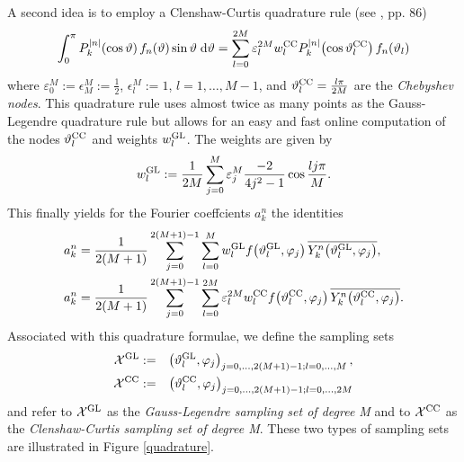 A second idea is to employ a Clenshaw-Curtis quadrature rule (see \cite{dara}, pp. 86)
$$
  \int_{0}^{\pi} P_{k}^{\left\vert n\right\vert}{\hspace{-0.4ex}}\left(\cos \vartheta\right) f_{n}{\hspace{-0.4ex}}\left(\vartheta\right) \sin \vartheta \; \text{\rm{d}} \vartheta = \sum_{l=0}^{2M} \varepsilon_{l}^{2M} w_{l}^{\mbox{\scriptsize\rm{CC}}} P_{k}^{\left\vert n\right\vert}{\hspace{-0.4ex}}\left(\cos \vartheta_{l}^{\mbox{\scriptsize\rm{CC}}}\right) f_{n}{\hspace{-0.4ex}}\left(\vartheta_{l}\right)
$$
where $\varepsilon_{0}^{M} := \epsilon_{M}^M := \frac{1}{2}$, $\epsilon_{l}^M := 1$, $l=1,\dots,M-1$, and $\vartheta_{l}^{\mbox{\scriptsize\rm{CC}}} = \frac{l\pi}{2M}$ are the \emph{Chebyshev nodes}.
This quadrature rule uses almost twice as many points as the Gauss-Legendre quadrature rule but allows for an easy and fast online computation of the nodes $\vartheta_{l}^{\mbox{\scriptsize\rm{CC}}}$
and weights $w_{l}^{\mbox{\scriptsize\rm{GL}}}$. The weights are given by
$$ w_{l}^{\mbox{\scriptsize\rm{GL}}} := \frac{1}{2M} \sum_{j=0}^{M} \varepsilon_{j}^{M} \frac{-2}{4j^2-1} \cos\frac{lj\pi}{M}.$$
This finally yields for the Fourier coeffcients $a_{k}^n$ the identities 
\begin{equation}
  \label{NFSFT:iDSFT}
  \begin{split}
    a_{k}^n & = \frac{1}{2(M+1)} \sum_{j=0}^{2(M+1)-1} \sum_{l=0}^{M} w_{l}^{\mbox{\scriptsize\rm{GL}}} f{\hspace{-0.4ex}}\left(\vartheta_{l}^{\mbox{\scriptsize\rm{GL}}},\varphi_{j}\right) \overline{Y_{k}^n{\hspace{-0.4ex}}\left(\vartheta_{l}^{\mbox{\scriptsize\rm{GL}}},\varphi_{j}\right)},\\
    a_{k}^n & = \frac{1}{2(M+1)} \sum_{j=0}^{2(M+1)-1} \sum_{l=0}^{2M} \varepsilon_{l}^{2M} w_{l}^{\mbox{\scriptsize\rm{CC}}} f{\hspace{-0.4ex}}\left(\vartheta_{l}^{\mbox{\scriptsize\rm{CC}}},\varphi_{j}\right) 
  \overline{Y_{k}^n{\hspace{-0.4ex}}\left(\vartheta_{l}^{\mbox{\scriptsize\rm{CC}}},\varphi_{j}\right)}.
  \end{split}
\end{equation}
Associated with this quadrature formulae, we define the sampling sets
\begin{eqnarray*}
  \mathcal{X}^{\mbox{\scriptsize\rm{GL}}} & := & \left(\vartheta_{l}^{\mbox{\scriptsize\rm{GL}}},\varphi_{j}\right)_{j=0,\dots,2(M+1)-1;l=0,\dots,M},\\
  \mathcal{X}^{\mbox{\scriptsize\rm{CC}}} & := & \left(\vartheta_{l}^{\mbox{\scriptsize\rm{CC}}},\varphi_{j}\right)_{j=0,\dots,2(M+1)-1;l=0,\dots,2M}
\end{eqnarray*}
and refer to $\mathcal{X}^{\mbox{\scriptsize\rm{GL}}}$ as the \emph{Gauss-Legendre sampling set of degree M} and to $\mathcal{X}^{\mbox{\scriptsize\rm{CC}}}$ as the 
\emph{Clenshaw-Curtis sampling set of degree M}. These two types of sampling sets are illustrated in Figure \ref{quadrature}.
